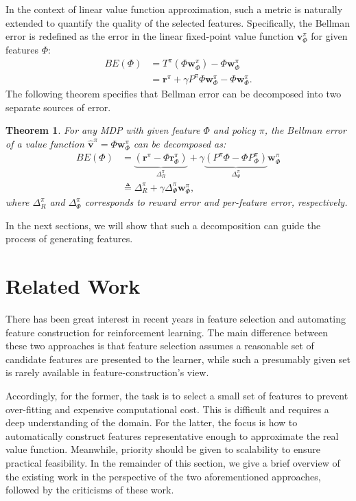 \documentclass[onecolumn, conference]{IEEEtran}
\newtheorem{theorem}{\textbf{Theorem}}
\begin{document}
		 In the context of linear value function approximation, such a metric is naturally extended to quantify the quality of the selected features. Specifically, the Bellman error is redefined as the error in the linear fixed-point value function $\boldsymbol{v}_\Phi^\pi$ for given features $\Phi$:
	\begin{equation}
		\begin{split}
			BE(\Phi) & = T^\pi (\Phi \boldsymbol{w}_\Phi^\pi) - \Phi \boldsymbol{w}_\Phi^\pi\\
			&= \boldsymbol{r}^\pi + \gamma P^\pi \Phi \boldsymbol{w}_\Phi^\pi - \Phi \boldsymbol{w}_\Phi^\pi .
		\end{split}
	\end{equation}
The following theorem specifies that Bellman error can be decomposed into two separate sources of error.
\begin{theorem}\label{decomposition}
		For any MDP with given feature $\Phi$ and policy $\pi$, the Bellman error of a value function $\hat{\boldsymbol{v}}^\pi=\Phi \boldsymbol{w}_\Phi^\pi$ can be decomposed as\cite{Parr2008AnAO}:
		\begin{equation}
		\begin{split}
			BE(\Phi) &=   \underbrace{(\boldsymbol{r}^\pi - \Phi \boldsymbol{r}_\Phi^\pi)}_{\Delta_R^{\pi}} + \gamma \underbrace{(P^\pi \Phi - \Phi P_\Phi^\pi)}_{\Delta_\Phi^\pi}\boldsymbol{w}_\Phi^{\pi}\\ &\triangleq \Delta_R^{\pi} +\gamma \Delta_\Phi^\pi \boldsymbol{w}_\Phi^{\pi},
		\end{split}
		\end{equation}
where $\Delta_R^{\pi}$ and $\Delta_\Phi^\pi$ corresponds to \textit{reward error} and \textit{per-feature error}, respectively. 
	\end{theorem}
	In the next sections, we will show that such a decomposition can guide the process of generating features.
\section{Related Work}\label{sec:related}
There has been great interest in recent years in feature selection and automating feature construction for reinforcement learning. The main difference between these two approaches is that feature selection assumes a reasonable set of candidate features are presented to the learner, while such a presumably given set is rarely available in feature-construction's view. 

Accordingly, for the former, the task is to select a small set of features to prevent over-fitting and expensive computational cost. This is difficult and requires a deep understanding of the domain. For the latter, the focus is how to automatically construct features representative enough to approximate the real value function. Meanwhile, priority should be given to scalability to ensure practical feasibility. In the remainder of this section, we give a brief overview of the existing work in the perspective of the two aforementioned approaches, followed by the criticisms of these work.
\end{document}
